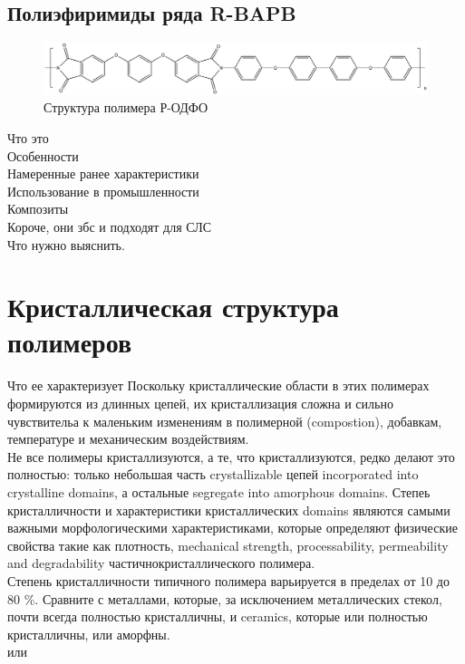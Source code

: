 \subsection{Полиэфиримиды ряда R-BAPB }
		
	\begin{figure}[h]
	\includegraphics[width=\textwidth]{fig/formula.png}
	\caption{Структура полимера Р-ОДФО \cite{pi-formula}}
	\label{fig:formula}
	\end{figure}

Что это\\
Особенности\\
Намеренные ранее характеристики\\
Использование в промышленности\\
Композиты\\
Короче, они збс и подходят для СЛС\\
Что нужно выяснить.\\

\section{Кристаллическая структура полимеров}

Что ее характеризует
Поскольку кристаллические области в этих полимерах формируются из длинных цепей, их кристаллизация сложна и сильно чувствительа к маленьким изменениям в полимерной (compostion), добавкам, температуре и механическим воздействиям.\\
Не все полимеры кристаллизуются, а те, что кристаллизуются, редко делают это полностью: только небольшая часть crystallizable цепей incorporated into crystalline domains, а остальные segregate into amorphous domains. Степеь кристалличности и характеристики кристаллических domains являются самыми важными морфологическими характеристиками, которые определяют физические свойства такие как плотность, mechanical strength, processability, permeability and degradability частичнокристаллического полимера.\\
Степень кристалличности типичного полимера варьируется в пределах от 10 до 80 \%. Сравните с металлами, которые, за исключением металлических стекол, почти всегда полностью кристалличны, и ceramics, которые или полностью кристалличны, или аморфны.\\ \cite{cryst3} или \cite{cryst1}






